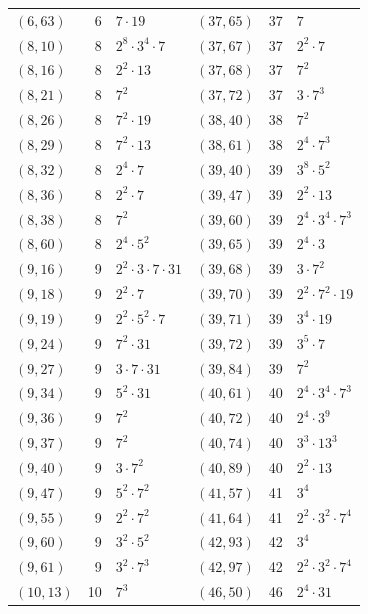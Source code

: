 \documentclass[11pt]{article}
\begin{document}
\begin{longtable}{@{}lrl@{\qquad}lrl@{}}
$(6,63)$ & 6 & $7\cdot 19$ & $(37,65)$ & 37 & $7$\\
$(8,10)$ & 8 & $2^{8}\cdot 3^{4}\cdot 7$ & $(37,67)$ & 37 & $2^{2}\cdot 7$\\
$(8,16)$ & 8 & $2^{2}\cdot 13$ & $(37,68)$ & 37 & $7^{2}$\\
$(8,21)$ & 8 & $7^{2}$ & $(37,72)$ & 37 & $3\cdot 7^{3}$\\
$(8,26)$ & 8 & $7^{2}\cdot 19$ & $(38,40)$ & 38 & $7^{2}$\\
$(8,29)$ & 8 & $7^{2}\cdot 13$ & $(38,61)$ & 38 & $2^{4}\cdot 7^{3}$\\
$(8,32)$ & 8 & $2^{4}\cdot 7$ & $(39,40)$ & 39 & $3^{8}\cdot 5^{2}$\\
$(8,36)$ & 8 & $2^{2}\cdot 7$ & $(39,47)$ & 39 & $2^{2}\cdot 13$\\
$(8,38)$ & 8 & $7^{2}$ & $(39,60)$ & 39 & $2^{4}\cdot 3^{4}\cdot 7^{3}$\\
$(8,60)$ & 8 & $2^{4}\cdot 5^{2}$ & $(39,65)$ & 39 & $2^{4}\cdot 3$\\
$(9,16)$ & 9 & $2^{2}\cdot 3\cdot 7\cdot 31$ & $(39,68)$ & 39 & $3\cdot 7^{2}$\\
$(9,18)$ & 9 & $2^{2}\cdot 7$ & $(39,70)$ & 39 & $2^{2}\cdot 7^{2}\cdot 19$\\
$(9,19)$ & 9 & $2^{2}\cdot 5^{2}\cdot 7$ & $(39,71)$ & 39 & $3^{4}\cdot 19$\\
$(9,24)$ & 9 & $7^{2}\cdot 31$ & $(39,72)$ & 39 & $3^{5}\cdot 7$\\
$(9,27)$ & 9 & $3\cdot 7\cdot 31$ & $(39,84)$ & 39 & $7^{2}$\\
$(9,34)$ & 9 & $5^{2}\cdot 31$ & $(40,61)$ & 40 & $2^{4}\cdot 3^{4}\cdot 7^{3}$\\
$(9,36)$ & 9 & $7^{2}$ & $(40,72)$ & 40 & $2^{4}\cdot 3^{9}$\\
$(9,37)$ & 9 & $7^{2}$ & $(40,74)$ & 40 & $3^{3}\cdot 13^{3}$\\
$(9,40)$ & 9 & $3\cdot 7^{2}$ & $(40,89)$ & 40 & $2^{2}\cdot 13$\\
$(9,47)$ & 9 & $5^{2}\cdot 7^{2}$ & $(41,57)$ & 41 & $3^{4}$\\
$(9,55)$ & 9 & $2^{2}\cdot 7^{2}$ & $(41,64)$ & 41 & $2^{2}\cdot 3^{2}\cdot 7^{4}$\\
$(9,60)$ & 9 & $3^{2}\cdot 5^{2}$ & $(42,93)$ & 42 & $3^{4}$\\
$(9,61)$ & 9 & $3^{2}\cdot 7^{3}$ & $(42,97)$ & 42 & $2^{2}\cdot 3^{2}\cdot 7^{4}$\\
$(10,13)$ & 10 & $7^{3}$ & $(46,50)$ & 46 & $2^{4}\cdot 31$\\

\end{longtable}
\end{document}
